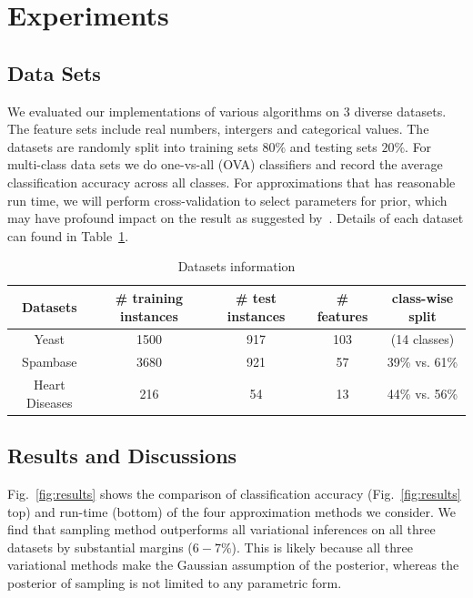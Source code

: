 \section{Experiments}
\label{sec:experiments}

\subsection{Data Sets}

We evaluated our implementations of various algorithms on 3 diverse datasets.
The feature sets include real numbers, intergers and categorical values. The
datasets are randomly split into training sets $80\%$ and testing sets $20\%$.
For multi-class data sets we do one-vs-all (OVA) classifiers and record the
average classification accuracy across all classes. For approximations that
has reasonable run time, we will perform cross-validation to select parameters
for prior, which may have profound impact on the result as suggested
  by~\cite{Asuncion2009smoothing}. Details of each dataset can found in
  Table~\ref{tb:datasets}.

\begin{table}
\begin{center}
\begin{tabular}{| c | c |  c | c | c |}
  \hline
  Datasets & \# training instances & \# test instances & \# features & class-wise split\\
  \hline
  Yeast & 1500 & 917 & 103 & (14 classes) \\
  \hline
  Spambase & 3680 & 921 & 57 & 39\% vs. 61\% \\
  \hline
  Heart Diseases & 216 & 54 & 13 & 44\% vs. 56\% \\
  \hline
\end{tabular}
\end{center}

\caption{Datasets information}
\label{tb:datasets}
\end{table}

\subsection{Results and Discussions}

Fig.~\ref{fig:results} shows the comparison of classification accuracy
(Fig.~\ref{fig:results} top) and run-time (bottom) of the four approximation
methods we consider. We find that sampling method outperforms all variational
inferences on all three datasets by substantial margins ($6-7\%$). This is
likely because all three variational methods make the Gaussian assumption of
the posterior, whereas the posterior of sampling is not limited to any
parametric form. 


